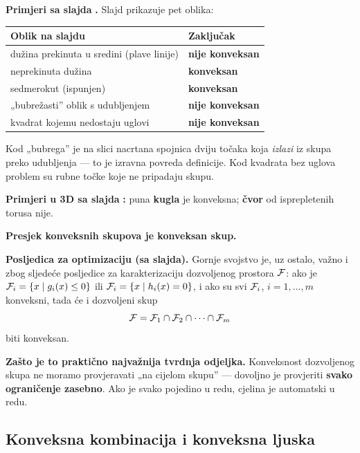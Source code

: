 \textbf{Primjeri sa slajda} \textbf{.} Slajd prikazuje pet oblika:

\begin{center}
\begin{tabular}{ll}
\toprule
\textbf{Oblik na slajdu} & \textbf{Zaključak} \\
\midrule
dužina prekinuta u sredini (plave linije) & \textbf{nije konveksan} \\
neprekinuta dužina & \textbf{konveksan} \\
sedmerokut (ispunjen) & \textbf{konveksan} \\
„bubrežasti” oblik s udubljenjem & \textbf{nije konveksan} \\
kvadrat kojemu nedostaju uglovi & \textbf{nije konveksan} \\
\bottomrule
\end{tabular}
\end{center}

Kod „bubrega” je na slici nacrtana spojnica dviju točaka koja \emph{izlazi} iz
skupa preko udubljenja --- to je izravna povreda definicije. Kod kvadrata bez
uglova problem su rubne točke koje ne pripadaju skupu.

\textbf{Primjeri u 3D sa slajda} \textbf{:} puna \textbf{kugla} je
konveksna; \textbf{čvor} od isprepletenih torusa nije.

\begin{teorem}
\textbf{Presjek konveksnih skupova je konveksan skup.}
\end{teorem}

\textbf{Posljedica za optimizaciju (sa slajda).} Gornje svojstvo je, uz ostalo,
važno i zbog sljedeće posljedice za karakterizaciju dozvoljenog prostora
$\mathcal{F}$: ako je $\mathcal{F}_i = \{x \mid g_i(x) \le 0\}$ ili
$\mathcal{F}_i = \{x \mid h_i(x) = 0\}$, i ako su svi $\mathcal{F}_i$, $i = 1,\dots,m$
konveksni, tada će i dozvoljeni skup
\[
\mathcal{F} = \mathcal{F}_1 \cap \mathcal{F}_2 \cap \dots \cap \mathcal{F}_m
\]
biti konveksan.

\textbf{Zašto je to praktično najvažnija tvrdnja odjeljka.} Konveksnost
dozvoljenog skupa ne moramo provjeravati „na cijelom skupu” --- dovoljno je
provjeriti \textbf{svako ograničenje zasebno}. Ako je svako pojedino u redu,
cjelina je automatski u redu.

\subsection{Konveksna kombinacija i konveksna ljuska}

